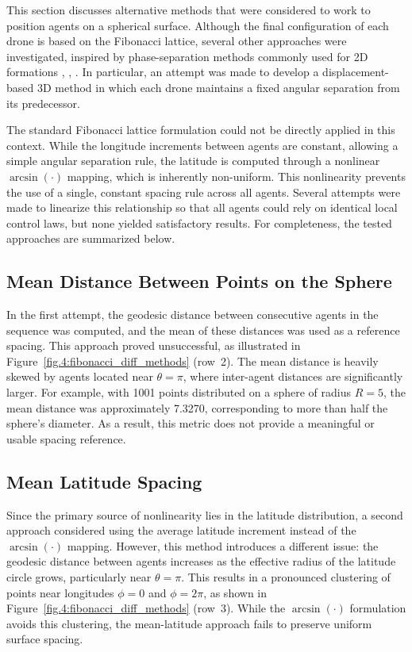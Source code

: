 This section discusses alternative methods that were considered to work to position agents on a spherical surface. Although the final configuration of each drone is based on the Fibonacci lattice, several other approaches were investigated, inspired by phase-separation methods commonly used for 2D formations \cite{Litimein2021}, \cite{Jin2018}, \cite{Kim2007}.  In particular, an attempt was made to develop a displacement-based 3D method in which each drone maintains a fixed angular separation from its predecessor.

The standard Fibonacci lattice formulation could not be directly applied in this context. While the longitude increments between agents are constant, allowing a simple angular separation rule, the latitude is computed through a nonlinear $\arcsin(\cdot)$ mapping, which is inherently non-uniform. This nonlinearity prevents the use of a single, constant spacing rule across all agents. Several attempts were made to linearize this relationship so that all agents could rely on identical local control laws, but none yielded satisfactory results. For completeness, the tested approaches are summarized below.

\subsection{Mean Distance Between Points on the Sphere}
In the first attempt, the geodesic distance between consecutive agents in the sequence was computed, and the mean of these distances was used as a reference spacing. This approach proved unsuccessful, as illustrated in Figure~\ref{fig.4:fibonacci_diff_methods} (row~2). The mean distance is heavily skewed by agents located near $\theta = \pi$, where inter-agent distances are significantly larger. For example, with 1001 points distributed on a sphere of radius $R = 5$, the mean distance was approximately 7.3270, corresponding to more than half the sphere's diameter. As a result, this metric does not provide a meaningful or usable spacing reference.

\subsection{Mean Latitude Spacing}
Since the primary source of nonlinearity lies in the latitude distribution, a second approach considered using the average latitude increment instead of the $\arcsin(\cdot)$ mapping. However, this method introduces a different issue: the geodesic distance between agents increases as the effective radius of the latitude circle grows, particularly near $\theta = \pi$. This results in a pronounced clustering of points near longitudes $\phi = 0$ and $\phi = 2\pi$, as shown in Figure~\ref{fig.4:fibonacci_diff_methods} (row~3). While the $\arcsin(\cdot)$ formulation avoids this clustering, the mean-latitude approach fails to preserve uniform surface spacing.

